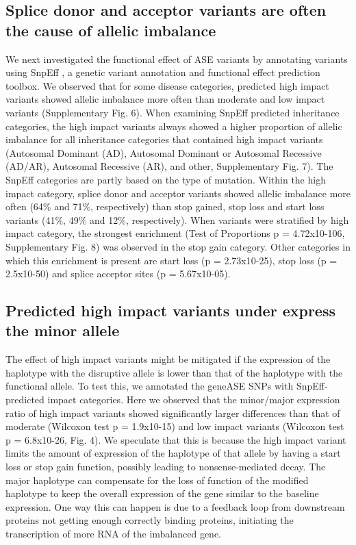 \subsection{Splice donor and acceptor variants are often the cause of allelic imbalance}
We next investigated the functional effect of ASE variants by annotating variants using SnpEff \cite{cingolaniProgramAnnotatingPredicting2012}, a genetic variant annotation and functional effect prediction toolbox. We observed that for some disease categories, predicted high impact variants showed allelic imbalance more often than moderate and low impact variants (Supplementary Fig. 6). When examining SnpEff predicted inheritance categories, the high impact variants always showed a higher proportion of allelic imbalance for all inheritance categories that contained high impact variants (Autosomal Dominant (AD), Autosomal Dominant or Autosomal Recessive (AD/AR), Autosomal Recessive (AR), and other, Supplementary Fig. 7). The SnpEff categories are partly based on the type of mutation. Within the high impact category, splice donor and acceptor variants showed allelic imbalance more often (64\% and 71\%, respectively) than stop gained, stop loss and start loss variants (41\%, 49\% and 12\%, respectively). When variants were stratified by high impact category, the strongest enrichment (Test of Proportions p = 4.72x10-106, Supplementary Fig. 8) was observed in the stop gain category. Other categories in which this enrichment is present are start loss (p = 2.73x10-25), stop loss (p = 2.5x10-50) and splice acceptor sites (p = 5.67x10-05).


\subsection{Predicted high impact variants under express the minor allele}
The effect of high impact variants might be mitigated if the expression of the haplotype with the disruptive allele is lower than that of the haplotype with the functional allele. To test this, we annotated the geneASE SNPs with SnpEff-predicted impact categories. Here we observed that the minor/major expression ratio of high impact variants showed significantly larger differences than that of moderate (Wilcoxon  test p = 1.9x10-15) and low impact variants (Wilcoxon test p = 6.8x10-26, Fig. 4). We speculate that this is because the high impact variant limits the amount of expression of the haplotype of that allele by having a start loss or stop gain function, possibly leading to nonsense-mediated decay. The major haplotype can compensate for the loss of function of the modified haplotype to keep the overall expression of the gene similar to the baseline expression. One way this can happen is due to a feedback loop from downstream proteins not getting enough correctly binding proteins, initiating the transcription of more RNA of the imbalanced gene. 

